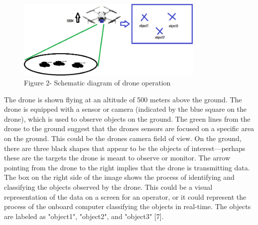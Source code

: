 \begin{figure}[H]
	\centering
	\includegraphics[width=0.8\textwidth]{assets/12}
	\caption*{Figure 2- Schematic diagram of drone operation}
\end{figure}

\begin{multicols}{2}
The drone is shown flying at an altitude of 500 meters above the ground. The
drone is equipped with a sensor or camera (indicated by the blue square
on the drone), which is used to observe objects on the ground. The green
lines from the drone to the ground suggest that the
drone\textquotesingle s sensors are focused on a specific area on the
ground. This could be the drone\textquotesingle s camera field of view.
On the ground, there are three black shapes that appear to be the
objects of interest---perhaps these are the targets the drone is meant
to observe or monitor. The arrow pointing from the drone to the right
implies that the drone is transmitting data. The box on the right side
of the image shows the process of identifying and classifying the
objects observed by the drone. This could be a visual representation of
the data on a screen for an operator, or it could represent the process
of the onboard computer classifying the objects in real-time. The
objects are labeled as "object1", "object2", and "object3" {[}7{]}.
\end{multicols}

